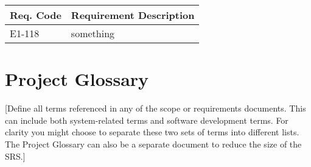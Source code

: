\documentclass[12pt]{article}
\begin{document}
\begin{table}[!h]
	\begin{tabular}{| l | l |}
		\hline
		\textbf{Req. Code} & \textbf{Requirement Description}\\
		\hline
		E1-118	& something\\
		\hline
	\end{tabular}
	\label{tab:ExtensibilityRequirements}
\end{table}


\section{Project Glossary}
[Define all terms referenced in any of the scope or requirements documents. This can include both system-related terms and software 
development terms. For clarity you might choose to separate these two sets of terms into different lists. The Project Glossary can 
also be a separate document to reduce the size of the SRS.]
\end{document}
